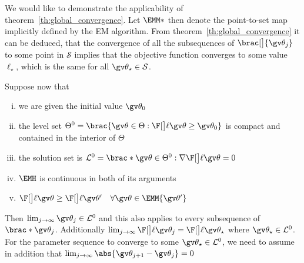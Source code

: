 We would like to demonstrate the applicability of theorem~\ref{th:global_convergence}.
Let $\EMM*$ then denote the point-to-set map implicitly defined by the EM algorithm.
From theorem~\ref{th:global_convergence} it can be deduced, that the convergence of all the
subsequences of $\brac[\big]{\Th_j}$ to some point in $\mathcal{S}$ implies that
the objective function converges to some value $\ell_\star$, which is the same
for all $\Th_\star\in\mathcal{S}$.

Suppose now that 
\begin{enumerate}[i)] \addtolength{\leftskip}{1cm} \itemsep1pt \parskip0pt 
	\item we are given the initial value $\Th_0$
	\item the level set $\Theta^0=\brac{\Th\in\Theta : \lLH[\Th]\geq \Th_0}$ 
is compact and contained in the interior of $\Theta$
	\item the solution set is $\mathcal{L}^0=\brac*{\Th\in\Theta^0 : \nabla\lLH[\Th]=0}$
	\item $\EMH$ is continuous in both of its arguments
	\item $\lLH[\Th]\geq\lLH[\Th']\quad \forall \Th\in\EMM{\Th'}$
\end{enumerate}
Then $\lim_{j\to\infty}\Th_j\in\mathcal{L}^0$ and 
this also applies to every subsequence of $\brac*{\Th_j}$. Additionally
$\lim_{j\to\infty}\lLH[\Th_j]=\lLH[\Th_\star]$ where $\Th_\star\in\mathcal{L}^0$.
For the parameter sequence to converge to some 
$\Th_\star\in\mathcal{L}^0$, we need to assume in addition that $\lim_{j\to\infty}\abs{\Th_{j+1}-\Th_{j}}=0$

